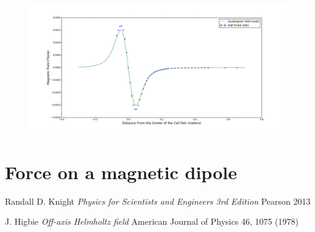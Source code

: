 \documentclass[aps,twocolumn,secnumarabic,balancelastpage,amsmath,amssymb,nofootinbib,floatfix]{revtex4-1}
\begin{document}
\begin{figure}[here]
\includegraphics[width=1\textwidth]{../DataValidation/quadPlot.png}
\caption{}
\label{apparatus}
\end{figure}

\section{Force on a magnetic dipole}



















\begin{thebibliography}{9}

	
	Randall D. Knight
	\emph{Physics for Scientists and Engineers 3rd Edition}
	Pearson 2013
	
	J. Higbie
	\emph{Off-axis Helmholtz field}
	American Journal of Physics 46, 1075 (1978)

	
	
\end{thebibliography}
\end{document}

